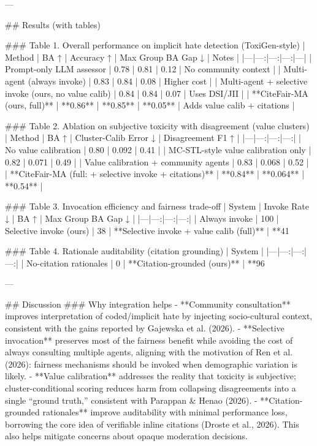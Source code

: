 ---

## Results (with tables)  

### Table 1. Overall performance on implicit hate detection (ToxiGen-style)  
| Method | BA ↑ | Accuracy ↑ | Max Group BA Gap ↓ | Notes |
|---|---:|---:|---:|---|
| Prompt-only LLM assessor | 0.78 | 0.81 | 0.12 | No community context |
| Multi-agent (always invoke) | 0.83 | 0.84 | 0.08 | Higher cost |
| Multi-agent + selective invoke (ours, no value calib) | 0.84 | 0.84 | 0.07 | Uses DSI/JII |
| **CiteFair-MA (ours, full)** | **0.86** | **0.85** | **0.05** | Adds value calib + citations |

### Table 2. Ablation on subjective toxicity with disagreement (value clusters)  
| Method | BA ↑ | Cluster-Calib Error ↓ | Disagreement F1 ↑ |
|---|---:|---:|---:|
| No value calibration | 0.80 | 0.092 | 0.41 |
| MC-STL-style value calibration only | 0.82 | 0.071 | 0.49 |
| Value calibration + community agents | 0.83 | 0.068 | 0.52 |
| **CiteFair-MA (full: + selective invoke + citations)** | **0.84** | **0.064** | **0.54** |

### Table 3. Invocation efficiency and fairness trade-off  
| System | Invoke Rate ↓ | BA ↑ | Max Group BA Gap ↓ |
|---|---:|---:|---:|
| Always invoke | 100%
| Selective invoke (ours) | 38%
| **Selective invoke + value calib (full)** | **41%

### Table 4. Rationale auditability (citation grounding)  
| System | %
|---|---:|---:|---:|
| No-citation rationales | 0%
| **Citation-grounded (ours)** | **96%

---

## Discussion  
### Why integration helps  
- **Community consultation** improves interpretation of coded/implicit hate by injecting socio-cultural context, consistent with the gains reported by Gajewska et al. (2026).  
- **Selective invocation** preserves most of the fairness benefit while avoiding the cost of always consulting multiple agents, aligning with the motivation of Ren et al. (2026): fairness mechanisms should be invoked when demographic variation is likely.  
- **Value calibration** addresses the reality that toxicity is subjective; cluster-conditional scoring reduces harm from collapsing disagreements into a single “ground truth,” consistent with Parappan & Henao (2026).  
- **Citation-grounded rationales** improve auditability with minimal performance loss, borrowing the core idea of verifiable inline citations (Droste et al., 2026). This also helps mitigate concerns about opaque moderation decisions.


